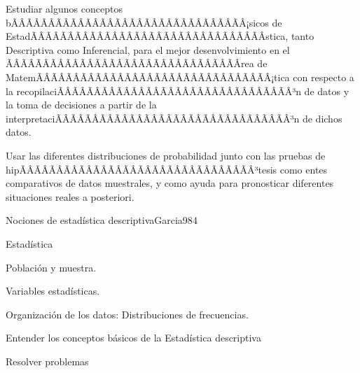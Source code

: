 \begin{sumilla}


\begin{objetivosdelcurso}
\item  Estudiar algunos conceptos bÃÂÃÂÃÂÃÂÃÂÃÂÃÂÃÂÃÂÃÂÃÂÃÂÃÂÃÂÃÂÃÂ¡sicos de EstadÃÂÃÂÃÂÃÂÃÂÃÂÃÂÃÂÃÂÃÂÃÂÃÂÃÂÃÂÃÂÃÂ­stica, tanto Descriptiva como Inferencial, para el mejor desenvolvimiento en el ÃÂÃÂÃÂÃÂÃÂÃÂÃÂÃÂÃÂÃÂÃÂÃÂÃÂÃÂÃÂÃÂrea de MatemÃÂÃÂÃÂÃÂÃÂÃÂÃÂÃÂÃÂÃÂÃÂÃÂÃÂÃÂÃÂÃÂ¡tica con respecto a la recopilaciÃÂÃÂÃÂÃÂÃÂÃÂÃÂÃÂÃÂÃÂÃÂÃÂÃÂÃÂÃÂÃÂ³n de datos y la toma de decisiones a partir de la interpretaciÃÂÃÂÃÂÃÂÃÂÃÂÃÂÃÂÃÂÃÂÃÂÃÂÃÂÃÂÃÂÃÂ³n de dichos datos.
\item  Usar las diferentes distribuciones de probabilidad junto con las pruebas de hipÃÂÃÂÃÂÃÂÃÂÃÂÃÂÃÂÃÂÃÂÃÂÃÂÃÂÃÂÃÂÃÂ³tesis como entes comparativos de datos muestrales, y como ayuda para pronosticar diferentes situaciones reales a posteriori.
\end{objetivosdelcurso}

\begin{outcomes}
\end{outcomes}

\begin{unit}{Nociones de estad\'istica descriptiva}{Garcia98}{4}
   \begin{topicos}
         \item  Estad\'istica
	 \item  Poblaci\'on y muestra.
	 \item  Variables estad\'isticas.
         \item  Organizaci\'on de los datos: Distribuciones de frecuencias.
   \end{topicos}

   \begin{objetivos}
         \item  Entender los conceptos b\'asicos de la Estad\'istica descriptiva
         \item  Resolver problemas
   \end{objetivos}
\end{unit}


\end{sumilla}
